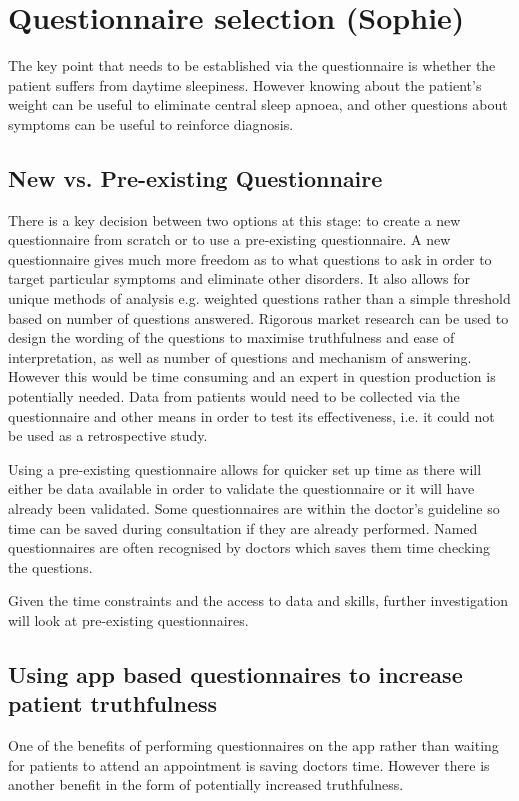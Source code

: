 \section{Questionnaire selection (Sophie)}
\label{sec:questionnaire-sophie}
The key point that needs to be established via the questionnaire is whether the patient suffers from daytime sleepiness. However knowing about the patient’s weight can be useful to eliminate central sleep apnoea, and other questions about symptoms can be useful to reinforce diagnosis. 

\subsection{New vs. Pre-existing Questionnaire}
 There is a key decision between two options at this stage: to create a new questionnaire from scratch or to use a pre-existing questionnaire. A new questionnaire gives much more freedom as to what questions to ask in order to target particular symptoms and eliminate other disorders. It also allows for unique methods of analysis e.g. weighted questions rather than a simple threshold based on number of questions answered. Rigorous market research can be used to design the wording of the questions to maximise truthfulness and ease of interpretation, as well as number of questions and mechanism of answering. However this would be time consuming and an expert in question production is potentially needed. Data from patients would need to be collected via the questionnaire and other means in order to test its effectiveness, i.e. it could not be used as a retrospective study.

Using a pre-existing questionnaire allows for quicker set up time as there will either be data available in order to validate the questionnaire or it will have already been validated. Some questionnaires are within the doctor’s guideline so time can be saved during consultation if they are already performed. Named questionnaires are often recognised by doctors which saves them time checking the questions.

Given the time constraints and the access to data and skills, further investigation will look at pre-existing questionnaires. 
\subsection{Using app based questionnaires to increase patient truthfulness}
One of the benefits of performing questionnaires on the app rather than waiting for patients to attend an appointment is saving doctors time. However there is another benefit in the form of potentially increased truthfulness. 

